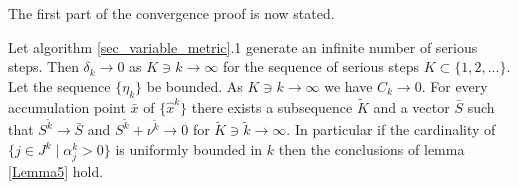 
%

The first part of the convergence proof is now stated.

\begin{theorem}
\label{theo_inf_ser_steps}
	Let algorithm \ref{sec_variable_metric}.1 generate an infinite number of serious steps. Then \(\delta_k \to 0\) as \(K \ni k \to \infty\) for the sequence of serious steps \(K \subset \{1,2,...\}\). 
	Let the sequence \(\{\eta_k\}\) be bounded. As \(K \ni k \to \infty\) we have \(C_k \to 0\). For every accumulation point \(\bar{x}\) of \(\{\hat{x}^k\}\) there exists a subsequence \(\tilde{K}\) and  a vector \(\bar{S}\) such that \(S^{\tilde{k}} \to \bar{S}\) and \(S^{\tilde{k}} + \nu^{\tilde{k}} \to 0\) for \(\tilde{K} \ni \tilde{k} \to \infty\).
In particular if the cardinality of \(\{j \in J^k\mid \alpha_j^k > 0\}\) is uniformly bounded in \(k\) then the conclusions of lemma \ref{Lemma5} hold.
\end{theorem}

